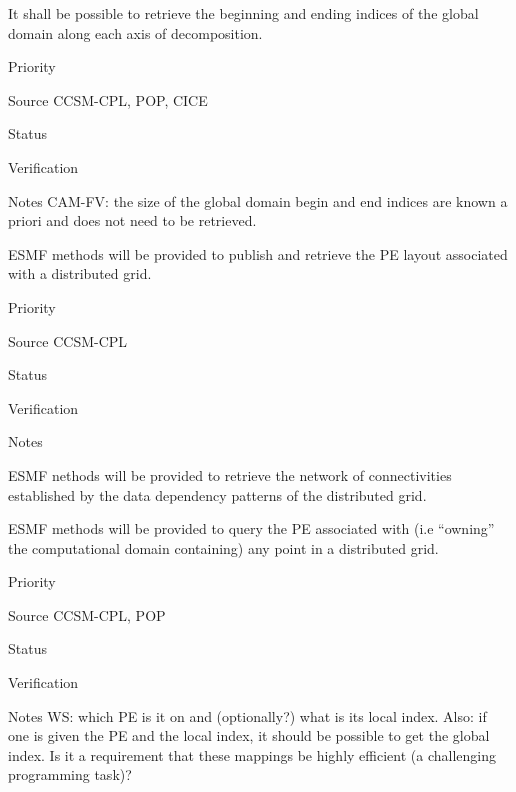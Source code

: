 
It shall be possible to retrieve the beginning and ending indices of the
global domain along each axis of decomposition.

\begin{reqlist}
\item[Priority]
\item[Source] CCSM-CPL, POP, CICE
\item[Status]
\item[Verification]
\item[Notes] CAM-FV: the size of the global domain begin and end
indices are known a priori and does not need to be retrieved.
\end{reqlist}


ESMF methods will be provided to publish and retrieve the PE layout
associated with a distributed grid.

\begin{reqlist}
\item[Priority]
\item[Source] CCSM-CPL
\item[Status]
\item[Verification]
\item[Notes]
\end{reqlist}


ESMF nethods will be provided to retrieve the network of
connectivities established by the data dependency patterns of the
distributed grid.


ESMF methods will be provided to query the PE associated with (i.e
``owning'' the computational domain containing) any point in a
distributed grid.

\begin{reqlist}
\item[Priority] 
\item[Source] CCSM-CPL, POP
\item[Status]
\item[Verification]
\item[Notes] WS: which PE is it on and (optionally?) what 
is its local index.  Also: if one is given the PE and the local index, 
it should be possible to get the global index.  Is it a requirement that
these mappings be highly efficient (a challenging programming task)?
\end{reqlist}

